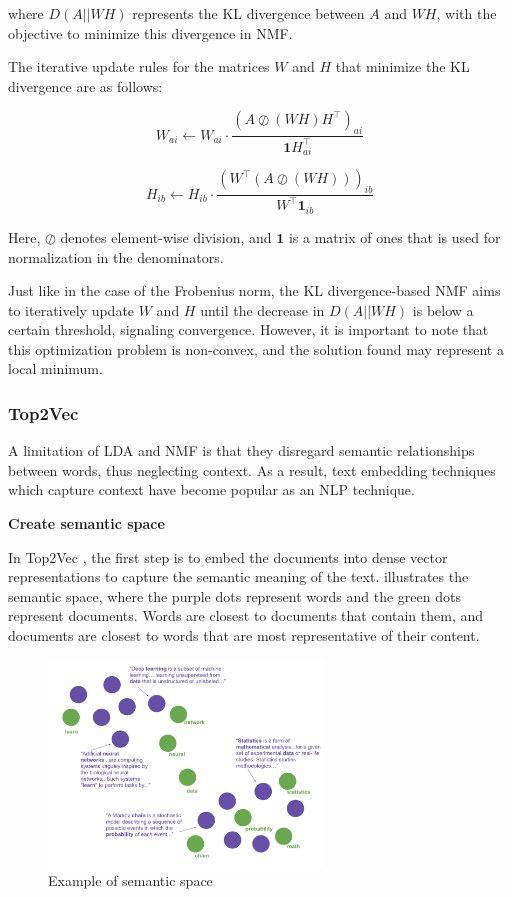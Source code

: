 \documentclass{article}
\begin{document}
where \( D(A || WH) \) represents the KL divergence between \( A \) and \( WH \), with the objective to minimize this divergence in NMF.

The iterative update rules for the matrices \( W \) and \( H \) that minimize the KL divergence are as follows:

\[
W_{ai} \leftarrow W_{ai} \cdot \frac{(A \oslash (WH)H^\top)_{ai}}{\mathbf{1}H^\top_{ai}}
\]

\[
H_{ib} \leftarrow H_{ib} \cdot \frac{(W^\top(A \oslash (WH)))_{ib}}{W^\top\mathbf{1}_{ib}}
\]

Here, \( \oslash \) denotes element-wise division, and \( \mathbf{1} \) is a matrix of ones that is used for normalization in the denominators.

Just like in the case of the Frobenius norm, the KL divergence-based NMF aims to iteratively update \( W \) and \( H \) until the decrease in \( D(A || WH) \) is below a certain threshold, signaling convergence. However, it is important to note that this optimization problem is non-convex, and the solution found may represent a local minimum.




\subsubsection{Top2Vec}
A limitation of LDA and NMF is that they disregard semantic relationships between words, thus neglecting context. As a result, text embedding techniques which capture context have become popular as an NLP technique.

\textbf{Create semantic space}

In Top2Vec \cite{angelov_top2vec_2020}, the first step is to embed the documents into dense vector representations to capture the semantic meaning of the text.  illustrates the semantic space, where the purple dots represent words and the green dots represent documents. Words are closest to documents that contain them, and documents are closest to words that are most representative of their content.

\begin{figure}[h] %
    \centering
    \includegraphics[width=0.65\textwidth]{images/doc_word_embedding.pdf}
    \caption{Example of semantic space \cite{angelov_top2vec_2020}}
    \label{fig:doc_word_embedding}
\end{figure}
\end{document}
